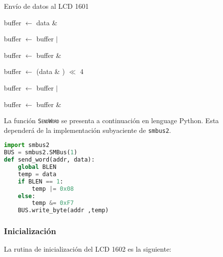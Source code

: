 \begin{algorithm}[H]
	\centering
	\caption{Envío de datos al LCD 1601}%
	\label{alg:lcd-data-send}
	\begin{algorithmic}
			\State buffer $\leftarrow$ data \& 

			\State buffer $\leftarrow$ buffer $\vert$ 

			\State {}

			\State {}

			\State buffer $\leftarrow$ buffer \& 

			\State {}

			\medskip

			\State buffer $\leftarrow$ (data \& ) $\ll$ 4

			\State buffer $\leftarrow$ buffer $\vert$ 

			\State {}

			\State {}

			\State buffer $\leftarrow$ buffer \& 

			\State {}
		\EndProcedure{}
	\end{algorithmic}
\end{algorithm}

La función \texttt{\textsc{SendWord}} se presenta a continuación en lenguage Python. Esta dependerá de la implementación subyaciente de \texttt{smbus2}.

\begin{lstlisting}[language=Python]
import smbus2
BUS = smbus2.SMBus(1)
def send_word(addr, data):
	global BLEN
	temp = data
	if BLEN == 1:
		temp |= 0x08
	else:
		temp &= 0xF7
	BUS.write_byte(addr ,temp)
\end{lstlisting}

\subsubsection{Inicialización}
\noindent
La rutina de inicialización del LCD 1602 es la siguiente:

